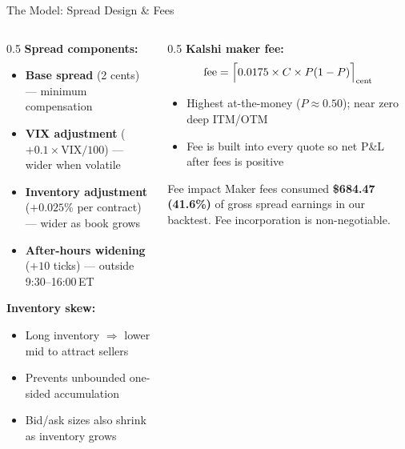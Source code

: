 \documentclass[aspectratio=169]{beamer}
\begin{document}
\begin{frame}{The Model: Spread Design \& Fees}
  \begin{columns}[T]
    \begin{column}{0.5\textwidth}
      \textbf{Spread components:}
      \begin{itemize}\small
        \item \textbf{Base spread} (2 cents) --- minimum compensation
        \item \textbf{VIX adjustment} ($+0.1{\times}\text{VIX}/100$) --- wider when volatile
        \item \textbf{Inventory adjustment} ($+0.025\%$ per contract) --- wider as book grows
        \item \textbf{After-hours widening} ($+10$ ticks) --- outside 9:30--16:00\,ET
      \end{itemize}
      \vspace{0.3em}
      \textbf{Inventory skew:}
      \begin{itemize}\small
        \item Long inventory $\Rightarrow$ lower mid to attract sellers
        \item Prevents unbounded one-sided accumulation
        \item Bid/ask sizes also shrink as inventory grows
      \end{itemize}
    \end{column}
    \begin{column}{0.5\textwidth}
      \textbf{Kalshi maker fee:}
      \[
        \text{fee} = \Bigl\lceil 0.0175 \times C \times P(1-P) \Bigr\rceil_{\text{cent}}
      \]
      \vspace{-0.7em}
      \begin{itemize}\small
        \item Highest at-the-money ($P \approx 0.50$); near zero deep ITM/OTM
        \item Fee is built into every quote so net P\&L after fees is positive
      \end{itemize}
      \vspace{0.3em}
      \begin{alertblock}{Fee impact}
        \small Maker fees consumed \textbf{\$684.47 (41.6\%)} of gross spread earnings
        in our backtest. Fee incorporation is non-negotiable.
      \end{alertblock}
    \end{column}
  \end{columns}
\end{frame}
\end{document}
